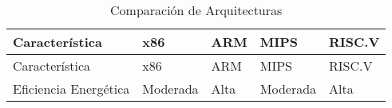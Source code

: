 \documentclass[12pt,twoside]{templates/unerthesis}
\begin{document}
\begin{longtable}[]{@{}lllll@{}}
\caption{\label{tab:tabla-comparacion-cpu}Comparación de Arquitecturas}\tabularnewline
\toprule
\begin{minipage}[b]{0.17\columnwidth}\raggedright
Característica\strut
\end{minipage} & \begin{minipage}[b]{0.18\columnwidth}\raggedright
x86\strut
\end{minipage} & \begin{minipage}[b]{0.16\columnwidth}\raggedright
ARM\strut
\end{minipage} & \begin{minipage}[b]{0.15\columnwidth}\raggedright
MIPS\strut
\end{minipage} & \begin{minipage}[b]{0.20\columnwidth}\raggedright
RISC.V\strut
\end{minipage}\tabularnewline
\midrule
\endfirsthead
\toprule
\begin{minipage}[b]{0.17\columnwidth}\raggedright
Característica\strut
\end{minipage} & \begin{minipage}[b]{0.18\columnwidth}\raggedright
x86\strut
\end{minipage} & \begin{minipage}[b]{0.16\columnwidth}\raggedright
ARM\strut
\end{minipage} & \begin{minipage}[b]{0.15\columnwidth}\raggedright
MIPS\strut
\end{minipage} & \begin{minipage}[b]{0.20\columnwidth}\raggedright
RISC.V\strut
\end{minipage}\tabularnewline
\midrule
\endhead
\begin{minipage}[t]{0.17\columnwidth}\raggedright
Eficiencia Energética\strut
\end{minipage} & \begin{minipage}[t]{0.18\columnwidth}\raggedright
Moderada\strut
\end{minipage} & \begin{minipage}[t]{0.16\columnwidth}\raggedright
Alta\strut
\end{minipage} & \begin{minipage}[t]{0.15\columnwidth}\raggedright
Moderada\strut
\end{minipage} & \begin{minipage}[t]{0.20\columnwidth}\raggedright
Alta\strut

\end{minipage}
\end{longtable}
\end{document}
